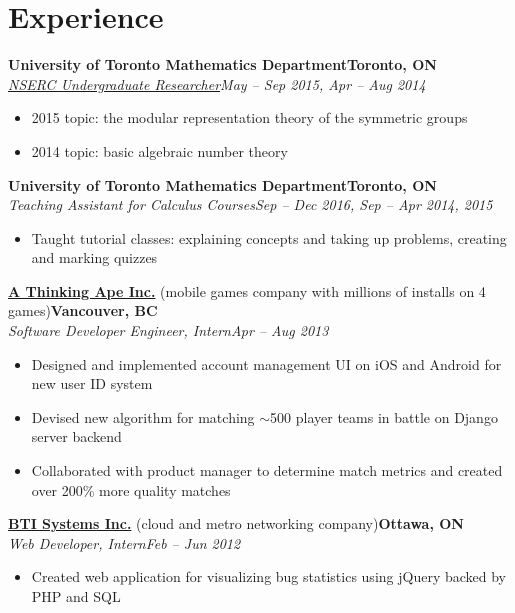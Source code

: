 \documentclass[10pt,letterpaper]{article}
\newcommand*\company[1]{\textbf{#1}}
\newcommand*\position[1]{\textit{#1}}
\newcommand*\location\company
\newcommand*\timespan\position
\begin{document}
\section*{Experience}
\company{University of Toronto Mathematics Department}\hfill\location{Toronto, ON}\\
\position{\href{http://www.nserc-crsng.gc.ca/Students-Etudiants/UG-PC/USRA-BRPC_eng.asp}{NSERC Undergraduate Researcher}}\hfill\timespan{May -- Sep 2015, Apr -- Aug 2014}
\begin{itemize}
\item 2015 topic: the modular representation theory of the symmetric groups
\item 2014 topic: basic algebraic number theory
\end{itemize}
\company{University of Toronto Mathematics Department}\hfill\location{Toronto, ON}\\
\position{Teaching Assistant for Calculus Courses}\hfill\timespan{Sep -- Dec 2016, Sep -- Apr 2014, 2015}
\begin{itemize}
\item Taught tutorial classes: explaining concepts and taking up problems, creating and marking quizzes
\end{itemize}
\company{\href{http://www.athinkingape.com/}{A Thinking Ape Inc.}} (mobile games company with millions of installs on 4 games)\hfill\location{Vancouver, BC}\\
\position{Software Developer Engineer, Intern}\hfill\timespan{Apr -- Aug 2013}
\begin{itemize}
\item Designed and implemented account management UI on iOS and Android for new user ID system
\item Devised new algorithm for matching \(\sim\)500 player teams in battle on Django server backend
\item Collaborated with product manager to determine match metrics and created over 200\% more quality matches
\end{itemize}
\company{\href{http://www.juniper.net/us/en/dm/bti/}{BTI Systems Inc.}} (cloud and metro networking company)\hfill\location{Ottawa, ON}\\
\position{Web Developer, Intern}\hfill\timespan{Feb -- Jun 2012}
\begin{itemize}
\item Created web application for visualizing bug statistics using jQuery backed by PHP and SQL
\end{itemize}
\end{document}
